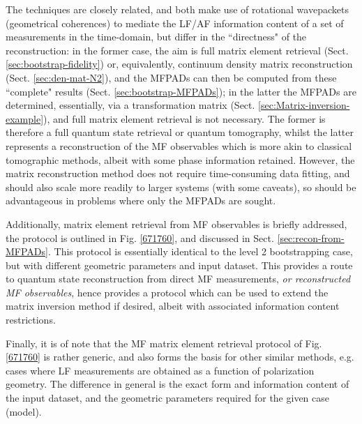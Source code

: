 \documentclass[10pt]{article}
\begin{document}
The techniques are closely related, and both make use of rotational wavepackets (geometrical coherences) to mediate the LF/AF information content of a set of measurements in the time-domain, but differ in the ``directness" of the reconstruction: in the former case, the aim is full matrix element retrieval (Sect. \ref{sec:bootstrap-fidelity}) or, equivalently, continuum density matrix reconstruction (Sect. \ref{sec:den-mat-N2}), and the MFPADs can then be computed from these ``complete" results (Sect. \ref{sec:bootstrap-MFPADs}); in the latter the MFPADs are determined, essentially, via a transformation matrix (Sect. \ref{sec:Matrix-inversion-example}), and full matrix element retrieval is not necessary. The former is therefore a full quantum state retrieval or quantum tomography, whilst the latter represents a reconstruction of the MF observables which is more akin to classical tomographic methods, albeit with some phase information retained. %
However, the matrix reconstruction method does not require time-consuming data fitting, and should also scale more readily to larger systems (with some caveats), so should be advantageous in problems where only the MFPADs are sought.

Additionally, matrix element retrieval from MF observables is briefly addressed, the protocol is outlined in Fig. \ref{671760}, and discussed in Sect. \ref{sec:recon-from-MFPADs}. This protocol is essentially identical to the level 2 bootstrapping case, but with different geometric parameters and input dataset. This provides a route to quantum state reconstruction from direct MF measurements, \textit{or reconstructed MF observables}, hence provides a protocol which can be used to extend the matrix inversion method if desired, albeit with associated information content restrictions.

Finally, it is of note that the MF matrix element retrieval protocol of Fig. \ref{671760} is rather generic, and also forms the basis for other similar methods, e.g. cases where LF measurements are obtained as a function of polarization geometry. The difference in general is the exact form and information content of the input dataset, and the geometric parameters required for the given case (model).

\end{document}
